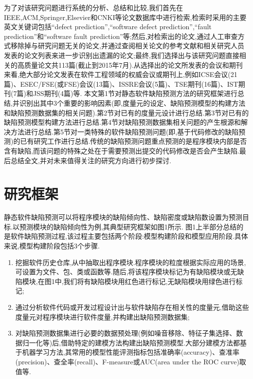\documentclass{rjthesis}
\begin{document}
	为了对该研究问题进行系统的分析、总结和比较,我们首先在IEEE,ACM,Springer,Elsevier和CNKI等论文数据库中进行检索,检索时采用的主要英文关键词包括“defect prediction”,“software defect prediction”,“fault prediction”和“software fault prediction”等;然后,对检索出的论文,通过人工审查方式移除掉与研究问题无关的论文,并通过查阅相关论文的参考文献和相关研究人员发表的论文列表来进一步识别出遗漏的论文;最终,我们选择出与该研究问题直接相关的高质量论文共113篇(截止到2015年7月).从选择出的论文所发表的会议和期刊来看,绝大部分论文发表在软件工程领域的权威会议或期刊上,例如ICSE会议(21篇)、ESEC/FSE(或FSE)会议(13篇)、ISSRE会议(5篇)、TSE期刊(16篇)、IST期刊(7篇)和JSS期刊(4篇)等.
	本文第1节对静态软件缺陷预测方法的研究框架进行总结,并识别出其中3个重要的影响因素(即,度量元的设定、缺陷预测模型的构建方法和缺陷预测数据集的相关问题).第2节对已有的度量元设计进行总结.第3节对已有的缺陷预测模型构建方法进行总结.第4节对缺陷预测数据集相关问题的产生根源和解决方法进行总结.第5节对一类特殊的软件缺陷预测问题(即,基于代码修改的缺陷预测)的已有研究工作进行总结.传统的缺陷预测问题重点预测的是程序模块内部是否含有缺陷,而该问题的特殊之处在于需要预测出提交的代码修改是否会产生缺陷.最后总结全文,并对未来值得关注的研究方向进行初步探讨.
	
	\section{研究框架}
	静态软件缺陷预测可以将程序模块的缺陷倾向性、缺陷密度或缺陷数设置为预测目标.以预测模块的缺陷倾向性为例,其典型研究框架如图1所示.
	图1上半部分总结的是软件缺陷预测过程,该过程主要包括两个阶段:模型构建阶段和模型应用阶段.具体来说,模型构建阶段包括3个步骤.

	\begin{enumerate}
		\item 挖掘软件历史仓库,从中抽取出程序模块.程序模块的粒度根据实际应用的场景,可设置为文件、包、类或函数等.随后,将该程序模块标记为有缺陷模块或无缺陷模块,在图1中,我们将有缺陷模块用红色进行标记,无缺陷模块用绿色进行标记;
		\item 通过分析软件代码或开发过程设计出与软件缺陷存在相关性的度量元,借助这些度量元对程序模块进行软件度量,并构建出缺陷预测数据集;
		\item 对缺陷预测数据集进行必要的数据预处理(例如噪音移除、特征子集选择、数据归一化等)后,借助特定的建模方法构建出缺陷预测模型.大部分建模方法都基于机器学习方法,其常用的模型性能评测指标包括准确率(accuracy)、查准率(precision)、查全率(recall)、F-measure或AUC(area under the ROC curve)取值等.
	\end{enumerate}
\end{document}
